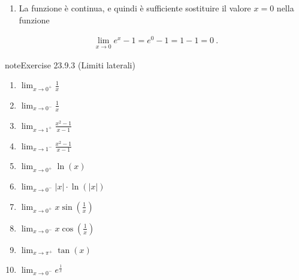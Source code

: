 \documentclass[letterpaper,10pt,italian]{jupyterBook}
\begin{document}
\begin{enumerate}
\item {} 
\sphinxAtStartPar
La funzione è continua, e quindi è sufficiente sostituire il valore \(x = 0\) nella funzione

\end{enumerate}
\begin{equation*}
\begin{split}\lim_{x \to 0} e^x - 1 = e^0 - 1 = 1 - 1 = 0 \ .\end{split}
\end{equation*} \label{exercise:ch/infinitesimal_calculus/analysis-problems-exercise-2}

\begin{sphinxadmonition}{note}{Exercise 23.9.3 (Limiti laterali)}


\begin{enumerate}
%
\item {} 
\sphinxAtStartPar
\(\lim_{x \to 0^+} \frac{1}{x}\)

\item {} 
\sphinxAtStartPar
\(\lim_{x \to 0^-} \frac{1}{x}\)

\item {} 
\sphinxAtStartPar
\(\lim_{x \to 1^+} \frac{x^2 - 1}{x - 1}\)

\item {} 
\sphinxAtStartPar
\(\lim_{x \to 1^-} \frac{x^2 - 1}{x - 1}\)

\item {} 
\sphinxAtStartPar
\(\lim_{x \to 0^+} \ln(x)\)

\item {} 
\sphinxAtStartPar
\(\lim_{x \to 0^-} |x| \cdot \ln(|x|)\)

\item {} 
\sphinxAtStartPar
\(\lim_{x \to 0^+} x \sin\left(\frac{1}{x}\right)\)

\item {} 
\sphinxAtStartPar
\(\lim_{x \to 0^-} x \cos\left(\frac{1}{x}\right)\)

\item {} 
\sphinxAtStartPar
\(\lim_{x \to \pi^+} \tan(x)\)

\item {} 
\sphinxAtStartPar
\(\lim_{x \to 0^-} e^{\frac{1}{x}}\)

\end{enumerate}
\end{sphinxadmonition}
 \label{exercise:ch/infinitesimal_calculus/analysis-problems-exercise-3}
\end{document}
